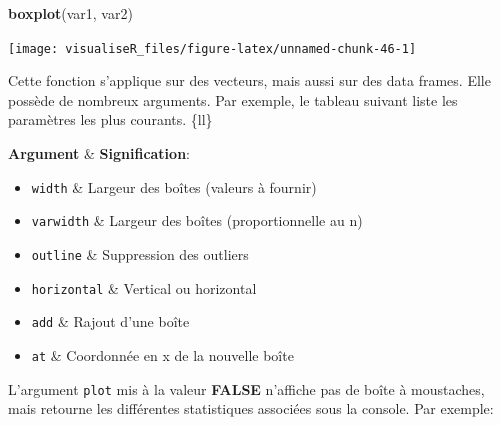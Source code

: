 \documentclass[]{article}
\newenvironment{Shaded}{\begin{snugshade}}{\end{snugshade}}
\newcommand{\CommentTok}[1]{\textcolor[rgb]{0.56,0.35,0.01}{\textit{#1}}}
\newcommand{\DataTypeTok}[1]{\textcolor[rgb]{0.13,0.29,0.53}{#1}}
\newcommand{\KeywordTok}[1]{\textcolor[rgb]{0.13,0.29,0.53}{\textbf{#1}}}
\newcommand{\NormalTok}[1]{#1}
\newcommand{\OtherTok}[1]{\textcolor[rgb]{0.56,0.35,0.01}{#1}}
\providecommand{\tightlist}{%
  \setlength{\itemsep}{0pt}\setlength{\parskip}{0pt}}
\begin{document}
\begin{Shaded}
\begin{Highlighting}[]
\KeywordTok{boxplot}\NormalTok{(var1, var2)}
\end{Highlighting}
\end{Shaded}

\begin{center}\texttt{[image: visualiseR\_files/figure-latex/unnamed-chunk-46-1]} \end{center}

Cette fonction s'applique sur des vecteurs, mais aussi sur des data frames. Elle possède de nombreux arguments. Par exemple, le tableau suivant liste les paramètres les plus courants.
\{ll\}

\textbf{Argument} \& \textbf{Signification}:

\begin{itemize}
\tightlist
\item
  \texttt{width} \& Largeur des boîtes (valeurs à fournir)
\item
  \texttt{varwidth} \& Largeur des boîtes (proportionnelle au n)
\item
  \texttt{outline} \& Suppression des outliers
\item
  \texttt{horizontal} \& Vertical ou horizontal
\item
  \texttt{add} \& Rajout d'une boîte
\item
  \texttt{at} \& Coordonnée en x de la nouvelle boîte
\end{itemize}

L'argument \texttt{plot} mis à la valeur \textbf{FALSE} n'affiche pas de boîte à moustaches, mais retourne les différentes statistiques associées sous la console. Par exemple:

\begin{Shaded}
\end{Shaded}
\end{document}
